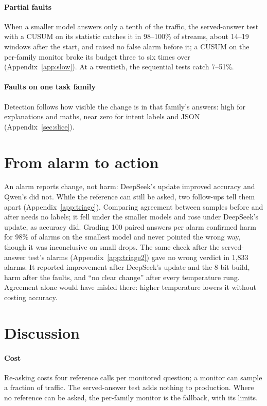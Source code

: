 \documentclass{article}
\begin{document}
\paragraph{Partial faults} When a smaller model answers only a tenth of the
traffic, the served-answer test with a CUSUM on its statistic catches it in
98--100\% of streams, about 14--19 windows after the start, and raised no false
alarm before it; a CUSUM on the per-family monitor broke its budget three to six
times over (Appendix~\ref{app:slow}). At a twentieth, the sequential tests catch 7--51\%.

\paragraph{Faults on one task family} Detection follows how visible the change is
in that family's answers: high for explanations and maths, near zero for intent
labels and JSON (Appendix~\ref{sec:slice}).

\section{From alarm to action}
\label{sec:discussion}

An alarm reports change, not harm: DeepSeek's update improved accuracy and
Qwen's did not. While the reference can still be asked, two follow-ups tell them
apart (Appendix~\ref{app:triage}). Comparing agreement between samples before and
after needs no labels; it fell under the smaller models and rose under DeepSeek's
update, as accuracy did. Grading 100 paired answers per alarm confirmed harm for 98\% of
alarms on the smallest model and never pointed the wrong way, though it was
inconclusive on small drops. The same check after the served-answer test's alarms
(Appendix~\ref{app:triage2}) gave no wrong verdict in 1{,}833 alarms. It reported
improvement after DeepSeek's update and the 8-bit build, harm after the faults,
and ``no clear change'' after every temperature rung. Agreement alone would have
misled there: higher temperature lowers it without costing accuracy.

\section{Discussion}

\paragraph{Cost} Re-asking costs four reference calls per monitored question; a
monitor can sample a fraction of traffic. The served-answer test adds nothing to
production. Where no reference can be asked, the per-family monitor is the
fallback, with its limits.
\end{document}
